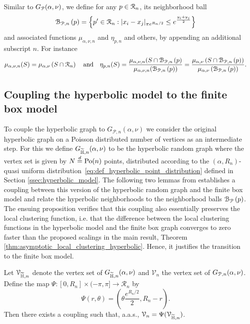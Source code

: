Similar to $G_{{\mathcal P}}(\alpha,\nu)$, we define for any $p \in {\mathcal R}_n$, its neighborhood ball
\[
	{\mathcal B}_{{\mathcal P},n}\left(p\right) = \left\{p^\prime \in {\mathcal R}_n : |x_i - x_j|_{\pi e^{R_n/2}} \leq e^{\frac{y_i + y_j}{2}}\right\}
\]
and associated functions $\mu_{\alpha,\nu ,n}$ and $\eta_{p,n}$ and others, by appending an additional subscript $n$. For instance
\[
	\mu_{\alpha,\nu,n}(S) = \mu_{\alpha,\nu}\left(S \cap {\mathcal R}_n\right) \quad \text{and} \quad 
    \eta_{p,n}(S) = \frac{\mu_{\alpha,\nu ,n}(S \cap {\mathcal B}_{{\mathcal P},n}\left(p\right)}{\mu_{\alpha,\nu,n}({\mathcal B}_{{\mathcal P},n}\left(p\right))}
    = \frac{\mu_{\alpha,\nu}\left(S\cap{\mathcal B}_{{\mathcal P},n}\left(p\right)\right)}{\mu_{\alpha,\nu}\left({\mathcal B}_{{\mathcal P},n}\left(p\right)\right)}.
\]


\subsection{Coupling the hyperbolic model to the finite box model}\label{ssec:coupling_H_P}

To couple the hyperbolic graph to $G_{\mathcal{P},n}(\alpha, \nu)$ we consider the original hyperbolic graph on a Poisson distributed number of vertices as an intermediate step. For this we define $G_{\widetilde{\mathbb{H}},n}(\alpha, \nu)$ to be the hyperbolic random graph where the vertex set is given by $N \stackrel{d}{=} {\mathrm{Po}}(n)$ points, distributed according to the $(\alpha, R_n)$-quasi uniform distribution~\eqref{eq:def_hyperbolic_point_distribution} defined in Section \ref{ssec:hyperbolic_model}. The following two lemmas from \cite{fountoulakis2018law} establishes a coupling between this version of the hyperbolic random graph and the finite box model and relate the hyperbolic neighborhoods to the neighborhood balls ${\mathcal B}_{{\mathcal P}}\left(p\right)$. The ensuing proposition verifies that this coupling also essentially preserves the local clustering function, i.e. that the difference between the local clustering functions in the hyperbolic model and the finite box graph converges to zero faster than the proposed scalings in the main result, Theorem \ref{thm:asymptotic_local_clustering_hyperbolic}. Hence, it justifies the transition to the finite box model. 

\begin{lemma}\label{lem:coupling_hyperbolic_poisson}
Let $\mathcal{V}_{\widetilde{\mathbb{H}}, n}$ denote the vertex set of $G_{\widetilde{\mathbb{H}},n}(\alpha, \nu)$ and $\mathcal{V}_n$ the vertex set of $G_{{\mathcal P},n}(\alpha, \nu)$. Define the map $\Psi : [0,R_n] \times (-\pi, \pi] \to \mathcal{R}_n$ by
\begin{equation}\label{eq:def_Psi}
	\Psi(r,\theta) = \left(\theta \frac{e^{R_n/2}}{2}, R_n - r\right).
\end{equation}
Then there exists a coupling such that, a.a.s., $\mathcal{V}_n = \Psi(\mathcal{V}_{\widetilde{\mathbb{H}},n})$. %
\end{lemma}

